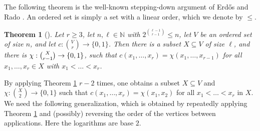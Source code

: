 \documentclass[11pt]{article}
\theoremstyle{plain}
\newtheorem{theorem}{Theorem}[section]
\begin{document}
The following theorem is the well-known stepping-down argument of Erd\H{o}s and Rado \cite{ER}. 
An ordered set is simply a set with a linear order, which we denote by $\leq$. 
  




\begin{theorem}[\cite{ER}]\label{thm:ER_basic}
Let $r \geq 3$, let $n,\ell \in \mathbb{N}$ with $2^{\binom{\ell-1}{r-1}} \leq n$, let 
$V$ be an ordered set of size $n$, and let
$c : \binom{V}{r} \rightarrow \{0,1\}$. Then there is a subset $X \subseteq V$ of size $\ell$, and there is $\chi : \binom{X}{r-1} \rightarrow \nolinebreak \{0,1\}$, such that 
$c(x_1,\dots,x_r) = \chi(x_1,\dots,x_{r-1})$ for all
$x_1,\dots,x_r \in X$ with
$x_1 < \dots < x_r$.
\end{theorem}

By applying Theorem \ref{thm:ER_basic} $r-2$ times, one obtains a subset $X \subseteq V$ and $\chi : \binom{X}{2} \rightarrow \{0,1\}$ such that $c(x_1,\dots,x_r) = \chi(x_1,x_2)$ for all 
$x_1 < \dots < x_r$ in $X$. We need the following generalization, which is obtained by repeatedly applying Theorem \ref{thm:ER_basic} and (possibly) reversing the order of the vertices between applications.  
Here the logarithms are base $2$.
\end{document}
